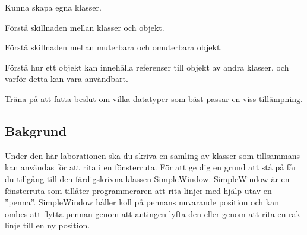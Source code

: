 

\Lab{\LabWeekSIX}

\begin{Goals}
\item Kunna skapa egna klasser.
\item Förstå skillnaden mellan klasser och objekt.
\item Förstå skillnaden mellan muterbara och omuterbara objekt.
\item Förstå hur ett objekt kan innehålla referenser till objekt av andra klasser, och varför detta kan vara användbart.
\item Träna på att fatta beslut om vilka datatyper som bäst passar en viss tillämpning.
\end{Goals}

\begin{Preparations}
\item {}


\end{Preparations}

\subsection{Bakgrund}

Under den här laborationen ska du skriva en samling av klasser som tillsammans kan användas för att rita i en fönsterruta. För att ge dig en grund att stå på får du tillgång till den färdigskrivna klassen SimpleWindow. SimpleWindow är en fönsterruta som tillåter programmeraren att rita linjer med hjälp utav en  ''penna''. SimpleWindow håller koll på pennans nuvarande position och kan ombes att flytta pennan genom att antingen lyfta den eller genom att rita en rak linje till en ny position.

